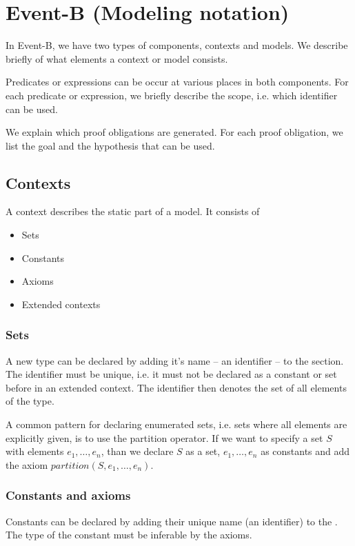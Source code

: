 \section{Event-B (Modeling notation)}
\label{reference_02}

In Event-B, we have two types of components, contexts and models.
We describe briefly of what elements a context or model consists.

Predicates or expressions can be occur at various places in both components.
For each predicate or expression, we briefly describe the scope, i.e. which
identifier can be used.

We explain which proof obligations are generated. 
For each proof obligation, we list the goal and the hypothesis that can be used.

\subsection{Contexts}
A context describes the static part of a model. It consists of
\begin{itemize}
\item Sets
\item Constants
\item Axioms
\item Extended contexts
\end{itemize}

\subsubsection{Sets}
\label{sets}
A new type can be declared by adding it's name -- an identifier -- to the  section.
The identifier must be unique, i.e. it must not be declared as a constant or set before in an
extended context.
The identifier then denotes the set of all elements of the type. 

A common pattern for declaring enumerated sets, i.e. sets where all elements are explicitly given,
is to use the partition operator. If we want to specify a set $S$ with elements $e_1,\ldots,e_n$, than
we declare $S$ as a set, $e_1,\ldots,e_n$ as constants and add the axiom $partition(S,e_1,\ldots,e_n)$.

\subsubsection{Constants and axioms}
\label{constants_and_axioms}
Constants can be declared by adding their unique name (an identifier) to the .
The type of the constant must be inferable by the axioms.

